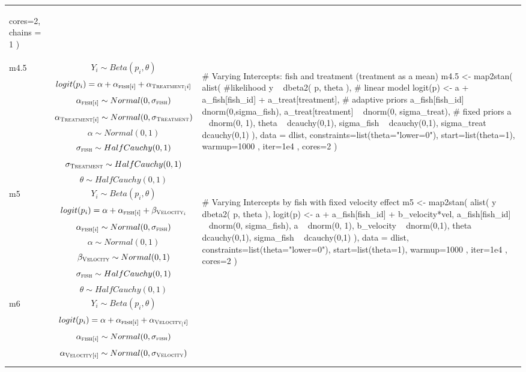 \begin{longtable}{ l | p{}| p{} }
{\begin{mylist}
  cores=2, chains = 1 )  \end{mylist}} 
\\ %
m4.5 &
$$ Y_i \sim Beta(p_i, \theta) $$
$$ logit(p_i) = \alpha + \alpha_{\textsc{fish}[i]} + \alpha_{\textsc{Treatment}_[i]} $$
$$ \alpha_{\textsc{fish}[i]} \sim Normal(0,\sigma_{\textsc{fish}}) $$
$$ \alpha_{\textsc{Treatment}[i]} \sim Normal(0,\sigma_{\textsc{Treatment}}) $$
$$ \alpha \sim Normal(0, 1) $$
$$ \sigma_{\textsc{fish}} \sim HalfCauchy(0,1) $$
$$ \sigma_{\textsc{Treatment}} \sim HalfCauchy(0,1) $$
$$ \theta \sim HalfCauchy(0, 1) $$
&
{\begin{mylist}
# Varying Intercepts: fish and treatment (treatment as a mean)
m4.5 <- map2stan(
  alist(
    #likelihood
    y ~ dbeta2( p, theta ),
    # linear model
    logit(p) <- a + a_fish[fish_id] + a_treat[treatment],
    # adaptive priors
    a_fish[fish_id] ~ dnorm(0,sigma_fish),
    a_treat[treatment] ~ dnorm(0, sigma_treat),
    # fixed priors
    a ~ dnorm(0, 1),
    theta ~ dcauchy(0,1),
    sigma_fish ~ dcauchy(0,1),
    sigma_treat ~ dcauchy(0,1)
  ),
  data = dlist,
  constraints=list(theta="lower=0"),
  start=list(theta=1), warmup=1000 , iter=1e4 , cores=2 )  \end{mylist}} 
\\ %
m5 &
$$ Y_i \sim Beta(p_i, \theta) $$
$$ logit(p_i) = \alpha + \alpha_{\textsc{fish}[i]} + \beta_{\textsc{Velocity}_i} $$
$$ \alpha_{\textsc{fish}[i]} \sim Normal(0,\sigma_{\textsc{fish}}) $$
$$ \alpha \sim Normal(0, 1) $$
$$ \beta_{\textsc{Velocity}} \sim Normal(0, 1) $$
$$ \sigma_{\textsc{fish}} \sim HalfCauchy(0,1) $$
$$ \theta \sim HalfCauchy(0, 1) $$
&
{\begin{mylist}
# Varying Intercepts by fish with fixed velocity effect
m5 <- map2stan(
  alist(
    y ~ dbeta2( p, theta ),
    logit(p) <- a + a_fish[fish_id] + b_velocity*vel,
    a_fish[fish_id] ~ dnorm(0, sigma_fish),
    a ~ dnorm(0, 1),
    b_velocity ~ dnorm(0,1),
    theta ~ dcauchy(0,1),
    sigma_fish ~ dcauchy(0,1)
  ),
  data = dlist,
  constraints=list(theta="lower=0"),
  start=list(theta=1), warmup=1000 , iter=1e4 , cores=2 )  \end{mylist}} 
\\ %
m6 &
$$ Y_i \sim Beta(p_i, \theta) $$
$$ logit(p_i) = \alpha + \alpha_{\textsc{fish}[i]} + \alpha_{\textsc{Velocity}_[i]} $$
$$ \alpha_{\textsc{fish}[i]} \sim Normal(0,\sigma_{\textsc{fish}}) $$
$$ \alpha_{\textsc{Velocity}[i]} \sim Normal(0,\sigma_{\textsc{Velocity}}) $$

\end{longtable}
